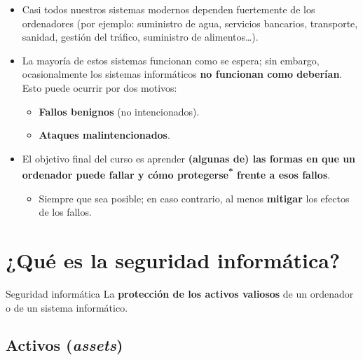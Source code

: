 \documentclass[11pt,a4paper]{report}
\begin{document}
\begin{itemize}
  \item Casi todos nuestros sistemas modernos dependen fuertemente de los ordenadores (por ejemplo: suministro de agua, servicios bancarios, transporte, sanidad, gestión del tráfico, suministro de alimentos\dots).
  \item La mayoría de estos sistemas funcionan como se espera; sin embargo, ocasionalmente los sistemas informáticos \textbf{no funcionan como deberían}. Esto puede ocurrir por dos motivos:
    \begin{itemize}
      \item \textbf{Fallos benignos} (no intencionados).
      \item \textbf{Ataques malintencionados}.
    \end{itemize}
  \item El objetivo final del curso es aprender \textbf{(algunas de) las formas en que un ordenador puede fallar y cómo protegerse\textsuperscript{*} frente a esos fallos}.
    \begin{itemize}
      \item[\textsuperscript{*}] Siempre que sea posible; en caso contrario, al menos \textbf{mitigar} los efectos de los fallos.
    \end{itemize}
\end{itemize}

\section{¿Qué es la seguridad informática?}

\begin{definicion}{Seguridad informática}
La \textbf{protección de los activos valiosos} de un ordenador o de un sistema informático.
\end{definicion}

\subsection{Activos (\emph{assets})}
\end{document}
